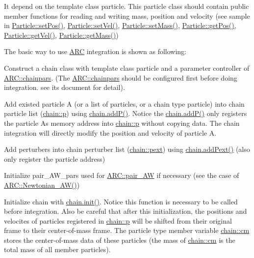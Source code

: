 It depend on the template class particle. This particle class should contain public member functions for reading and writing mass, position and velocity (see sample in \hyperlink{classParticle_a97d76b66aed57834c105b78b10643b81}{Particle\+::set\+Pos()}, \hyperlink{classParticle_a07c405254ac3f03854e7523ff473c828}{Particle\+::set\+Vel()}, \hyperlink{classParticle_a620f479862b90468a77da4e9cf5c0ff5}{Particle\+::set\+Mass()}, \hyperlink{classParticle_a4ec76421cddd91b1f27357fb182f6923}{Particle\+::get\+Pos()}, \hyperlink{classParticle_ab3d63df7f8c22f232b096ae33b6ea3ac}{Particle\+::get\+Vel()}, \hyperlink{classParticle_a2576aff503f68e78ced91406512b1255}{Particle\+::get\+Mass()})

The basic way to use \hyperlink{namespaceARC}{A\+RC} integration is shown as following\+:
\begin{DoxyEnumerate}
\item Construct a chain class with template class particle and a parameter controller of \hyperlink{classARC_1_1chainpars}{A\+R\+C\+::chainpars}. (The \hyperlink{classARC_1_1chainpars}{A\+R\+C\+::chainpars} should be configured first before doing integration. see its document for detail).
\item Add existed particle \textquotesingle{}A\textquotesingle{} (or a list of particles, or a chain type particle) into chain particle list (\hyperlink{classARC_1_1chain_af1793b656e139e1f87c2e0a55f87514b}{chain\+::p}) using \hyperlink{classARC_1_1chain_a0f91c399beb1e5c0db6ed7e2b4d00477}{chain.\+add\+P()}. Notice the \hyperlink{classARC_1_1chain_a0f91c399beb1e5c0db6ed7e2b4d00477}{chain.\+add\+P()} only registers the particle A\textquotesingle{}s memory address into \hyperlink{classARC_1_1chain_af1793b656e139e1f87c2e0a55f87514b}{chain\+::p} without copying data. The chain integration will directly modify the position and velocity of particle A.
\item Add perturbers into chain perturber list (\hyperlink{classARC_1_1chain_a6e4f41c7d3f8d44a4a01734ff4ab20cf}{chain\+::pext}) using \hyperlink{classARC_1_1chain_a029906394e7b73881c0980c00bf978f7}{chain.\+add\+Pext()} (also only register the particle address)
\item Initialize pair\+\_\+\+A\+W\+\_\+pars used for \hyperlink{namespaceARC_a5c4308ca4a8d0e0ff59fdce30f00274c}{A\+R\+C\+::pair\+\_\+\+AW} if necessary (see the case of \hyperlink{namespaceARC_ab9fc6518902e918927d8c6bd3d51401d}{A\+R\+C\+::\+Newtonian\+\_\+\+A\+W()})
\item Initialize chain with \hyperlink{classARC_1_1chain_aa016cf633d19079dca24565b80a36a3f}{chain.\+init()}. Notice this function is necessary to be called before integration. Also be careful that after this initialization, the positions and velocites of particles registered in \hyperlink{classARC_1_1chain_af1793b656e139e1f87c2e0a55f87514b}{chain\+::p} will be shifted from their original frame to their center-\/of-\/mass frame. The particle type member variable \hyperlink{classARC_1_1chain_ae9f6a5cbf7aac2b33c7274e7e10916ed}{chain\+::cm} stores the center-\/of-\/mass data of these particles (the mass of \hyperlink{classARC_1_1chain_ae9f6a5cbf7aac2b33c7274e7e10916ed}{chain\+::cm} is the total mass of all member particles).

\end{DoxyEnumerate}
